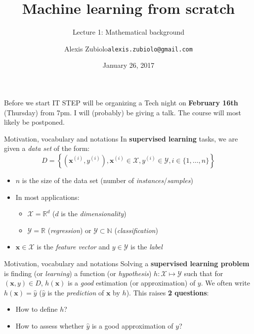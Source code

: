 \documentclass{beamer}
\title[Course presentation]{Machine learning from scratch}
\subtitle{Lecture 1: Mathematical background}
\author{Alexis Zubiolo\newline\texttt{alexis.zubiolo@gmail.com}}
\institute{Data Science Team Lead @ Adcash}
\date{January 26, 2017}
\newcommand{\X}{\mathcal{X}}
\newcommand{\Y}{\mathcal{Y}}
\newcommand{\real}{\mathbb{R}}
\newcommand{\N}{\mathbb{N}}
\newcommand{\yhat}{\hat{y}}
\newcommand{\bxi}{\bm{x}^{(i)}}
\newcommand{\bx}{\bm{x}}
\newcommand{\yi}{y^{(i)}}
\newcommand{\1}[1]{\mathbbm{1}\left[#1\right]}
\begin{document}
\begin{frame}
  \titlepage
\end{frame}

\begin{frame}{Before we start}
IT STEP will be organizing a Tech night on \textbf{February 16th} (Thursday) from 7pm. I will (probably) be giving a talk. The course will most likely be postponed.
\end{frame}

\begin{frame}{Motivation, vocabulary and notations}
In \textbf{supervised learning} tasks, we are given a \textit{data set} of the form:
$$ D = \left\{ \left(\bxi, \yi\right), \bxi \in \X, \yi \in \Y, i \in \{1, \dots, n \}  \right\}$$
\pause
\begin{itemize}
	\item $n$ is the size of the data set (number of \textit{instances}/\textit{samples})
	\item In most applications:
	\begin{itemize}
		\item $\X = \real^d$ ($d$ is the \textit{dimensionality})
		\item $\Y = \real$ (\textit{regression}) or $\Y \subset \N$ (\textit{classification})
	\end{itemize}		
	\item $\bx \in \X$ is the \textit{feature vector} and $y \in \Y$ is the \textit{label}
\end{itemize}
\end{frame}

\begin{frame}{Motivation, vocabulary and notations}
Solving a \textbf{supervised learning problem} is finding (or \textit{learning}) a function (or \textit{hypothesis}) $h : \X \mapsto \Y$ such that for $(\bx, y)\in D$, $h(\bx)$ is a \textit{good} estimation  (or approximation) of $y$.
\pause
\vfill
We often write $h(\bx) = \yhat$ ($\yhat$ is the \textit{prediction} of $\bx$ by $h$).
\pause
\vfill
This raises \textbf{2 questions}:
\begin{itemize}
	\item How to define $h$?
	\item How to assess whether $\yhat$ is a good approximation of $y$?
\end{itemize}
\end{frame}
\end{document}
